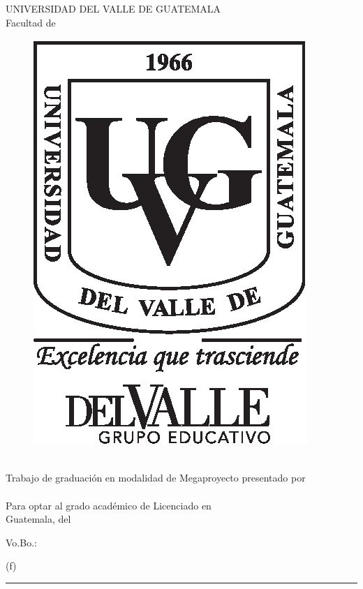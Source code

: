 \documentclass[10pt, letterpaper]{report}
\begin{document}
\ifdefined\CAPcaratula
	\newpage
	\pagecolor{white}
	\color{black}
	\setcounter{page}{1}
	\thispagestyle{empty}
	\begin{center}
		\LARGE UNIVERSIDAD DEL VALLE DE GUATEMALA\\
		\LARGE Facultad de \uvgfacultad \\[0.75cm]
	\end{center}
	\begin{figure}[h]
		\begin{center}
		\includegraphics[height=5.5 cm]{plantilla/escudoUVGnegro.eps}
		\vspace{0.5in}
		\end{center}
	\end{figure}
	\begin{center}
		\LARGE \textbf{\titulotesis} \\
		\vfill
		\vfill
		\Large Trabajo de graduación en modalidad de Megaproyecto presentado por \\
		\Large \nombreestudiante \\
		\Large Para optar al grado académico de Licenciado en \uvgcarrera \\
		\vfill
		\large Guatemala, \mesentrega del \anoentrega
	\end{center}
\fi

\ifdefined\CAPfirmas
	\newpage
	\thispagestyle{empty}
	\vspace*{0.5in}
	\large Vo.Bo.:\\[1cm]
	\begin{center}
		(f) \rule[1pt]{4 in}{1pt}\\
		\nombreasesor
	\end{center}
	\vspace{1in}
\end{document}
